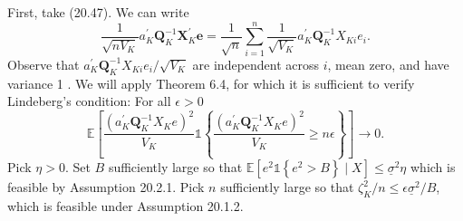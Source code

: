 \documentclass[10pt]{article}
\begin{document}
First, take (20.47). We can write
$$
\frac{1}{\sqrt{n V_{K}}} a_{K}^{\prime} \boldsymbol{Q}_{K}^{-1} \boldsymbol{X}_{K}^{\prime} \boldsymbol{e}=\frac{1}{\sqrt{n}} \sum_{i=1}^{n} \frac{1}{\sqrt{V_{K}}} a_{K}^{\prime} \boldsymbol{Q}_{K}^{-1} X_{K i} e_{i} .
$$
Observe that $a_{K}^{\prime} \boldsymbol{Q}_{K}^{-1} X_{K i} e_{i} / \sqrt{V_{K}}$ are independent across $i$, mean zero, and have variance 1 . We will apply Theorem 6.4, for which it is sufficient to verify Lindeberg's condition: For all $\epsilon>0$
$$
\mathbb{E}\left[\frac{\left(a_{K}^{\prime} \boldsymbol{Q}_{K}^{-1} X_{K} e\right)^{2}}{V_{K}} \mathbb{1}\left\{\frac{\left(a_{K}^{\prime} \boldsymbol{Q}_{K}^{-1} X_{K} e\right)^{2}}{V_{K}} \geq n \epsilon\right\}\right] \rightarrow 0 .
$$
Pick $\eta>0$. Set $B$ sufficiently large so that $\mathbb{E}\left[e^{2} \mathbb{1}\left\{e^{2}>B\right\} \mid X\right] \leq \underline{\sigma}^{2} \eta$ which is feasible by Assumption 20.2.1. Pick $n$ sufficiently large so that $\zeta_{K}^{2} / n \leq \epsilon \underline{\sigma}^{2} / B$, which is feasible under Assumption 20.1.2.
\end{document}
